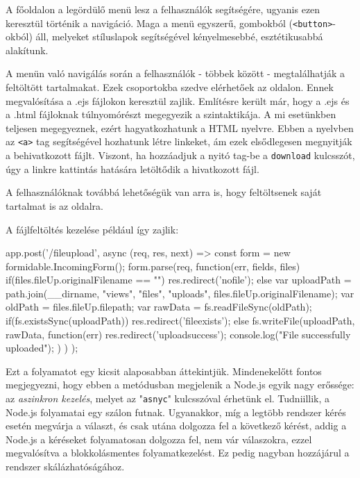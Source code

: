 A főoldalon a legördülő menü lesz a felhasználók segítségére, ugyanis ezen keresztül történik a navigáció. Maga a menü egyszerű, gombokból (\texttt{<button>}-okból) áll, melyeket stíluslapok segítségével kényelmesebbé, esztétikusabbá alakítunk.

A menün való navigálás során a felhasználók - többek között - megtalálhatják a feltöltött tartalmakat. Ezek csoportokba szedve elérhetőek az oldalon. Ennek megvalósítása a .ejs fájlokon keresztül zajlik. Említésre került már, hogy a .ejs és a .html fájloknak túlnyomórészt megegyezik a szintaktikája. A mi esetünkben teljesen megegyeznek, ezért hagyatkozhatunk a HTML nyelvre. Ebben a nyelvben az \texttt{<a>} tag segítségével hozhatunk létre linkeket, ám ezek elsődlegesen megnyitják a behivatkozott fájlt. Viszont, ha hozzáadjuk a nyitó tag-be a \texttt{download} kulcsszót, úgy a linkre kattintás hatására letöltődik a hivatkozott fájl.

A felhasználóknak továbbá lehetőségük van arra is, hogy feltöltsenek saját tartalmat is az oldalra.

A fájlfeltöltés kezelése például így zajlik:

\begin{javascript}
app.post('/fileupload', async (req, res, next) => {
  const form = new formidable.IncomingForm();
  form.parse(req, function(err, fields, files){
    if(files.fileUp.originalFilename == ""){
      res.redirect('nofile');
    }
    else{
      var uploadPath = path.join(__dirname, "views", "files",
"uploads", files.fileUp.originalFilename);
      var oldPath = files.fileUp.filepath;
      var rawData = fs.readFileSync(oldPath);
      if(fs.existsSync(uploadPath)){
        res.redirect('fileexists');
      }
      else{
        fs.writeFile(uploadPath, rawData, function(err){
          res.redirect('uploadsuccess');
          console.log("File successfully uploaded");
        })
      }
    }
  })
});
\end{javascript}

Ezt a folyamatot egy kicsit alaposabban áttekintjük. Mindenekelőtt fontos megjegyezni, hogy ebben a metódusban megjelenik a Node.js egyik nagy erőssége: az \textit{aszinkron kezelés}, melyet az "\texttt{asnyc}" kulcsszóval érhetünk el. Tudniillik, a Node.js folyamatai egy szálon futnak. Ugyanakkor, míg a legtöbb rendszer kérés esetén megvárja a választ, és csak utána dolgozza fel a következő kérést, addig a Node.js a kéréseket folyamatosan dolgozza fel, nem vár válaszokra, ezzel megvalósítva a blokkolásmentes folyamatkezelést. Ez pedig nagyban hozzájárul a rendszer skálázhatóságához.

